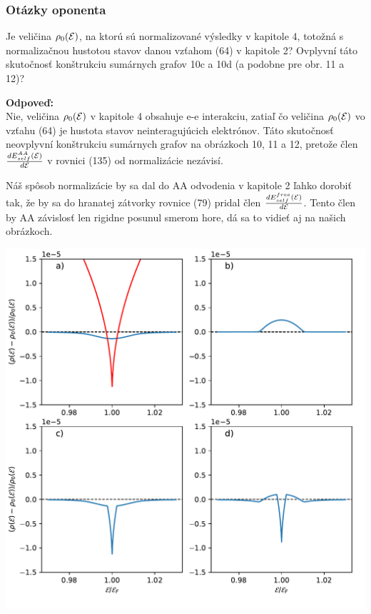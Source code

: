 \documentclass[
	11pt, %
]{beamer}
\begin{document}
\begin{frame}
\frametitle{Otázky oponenta}
Je veličina $\rho_0(\mathcal{E})$, na ktorú sú normalizované výsledky v kapitole 4, totožná s normalizačnou hustotou stavov danou vzťahom (64) v kapitole 2? Ovplyvní táto skutočnosť
konštrukciu sumárnych grafov 10c a 10d (a podobne pre obr. 11 a 12)?

\vspace{5mm}
\textbf{Odpoveď:}\\
Nie, veličina $\rho_0(\mathcal{E})$ v kapitole 4 obsahuje e-e interakciu, zatiaľ čo veličina $\rho_0(\mathcal{E})$ vo vzťahu (64) je hustota stavov neinteragujúcich elektrónov. Táto skutočnosť neovplyvní konštrukciu sumárnych grafov na obrázkoch 
10, 11 a 12, pretože člen $\frac{dE^{AA}_{self}(\mathcal{E})}{d\mathcal{E}}$ v rovnici (135) od  normalizácie nezávisí. 

\vspace{5mm}
Náš spôsob normalizácie by sa dal do AA odvodenia v kapitole 2 ľahko dorobiť tak, že by sa do hranatej zátvorky rovnice (79) pridal člen $\frac{dE^{free}_{self}(\mathcal{E})}{d\mathcal{E}}$. Tento člen by AA závislosť len rigidne posunul smerom hore, dá sa to vidieť aj na našich obrázkoch.
\end{frame}
\begin{frame}
\includegraphics[scale=0.5]{grafy/plot_tau_1_c_1}
\end{frame}
\end{document}
